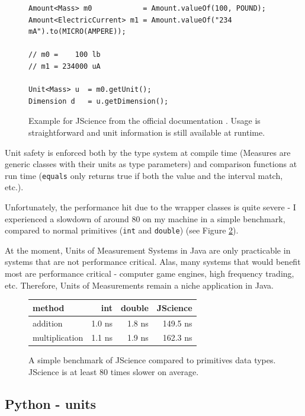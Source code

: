 \documentclass[12pt,oneside,a4paper]{scrbook}
\theoremstyle{definition}
\begin{document}
\begin{figure}
\begin{verbatim}
Amount<Mass> m0            = Amount.valueOf(100, POUND);
Amount<ElectricCurrent> m1 = Amount.valueOf("234 mA").to(MICRO(AMPERE));

// m0 =    100 lb
// m1 = 234000 uA

Unit<Mass> u  = m0.getUnit();
Dimension d   = u.getDimension();

\end{verbatim}
\caption{Example for JScience from the official documentation \citep{Dautelle11}. Usage is straightforward and unit information is still available at runtime.}
\label{code:jscience_example}
\end{figure}

Unit safety is enforced both by the type system at compile time (Measures are generic classes with their units as type parameters) and comparison functions at run time (\verb/equals/ only returns true if both the value and the interval match, etc.).

Unfortunately, the performance hit due to the wrapper classes is quite severe - I experienced a slowdown of around 80 on my machine in a simple benchmark, compared to normal primitives (\verb/int/ and \verb/double/) (see Figure \ref{bench:jscience}).

At the moment, Units of Measurement Systems in Java are only practicable in systems that are not performance critical. Alas, many systems that would benefit most are performance critical - computer game engines, high frequency trading, etc. Therefore, Units of Measurements remain a niche application in Java.

\begin{figure}
\begin{tabular}{lrrr}
method          & int    & double  & JScience \\
\midrule
addition        & 1.0 ns &  1.8 ns    &   149.5 ns \\
multiplication  & 1.1 ns &  1.9 ns    &   162.3 ns
\end{tabular}
\caption{A simple benchmark of JScience compared to primitives data types. JScience is at least 80 times slower on average.}
\label{bench:jscience}
\end{figure}


\subsection{Python - units}
\end{document}
